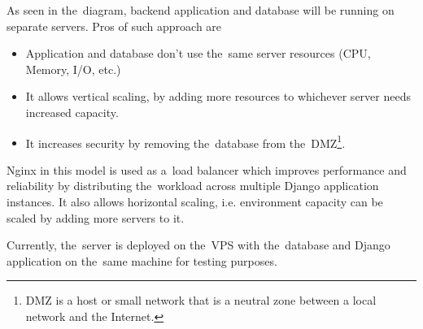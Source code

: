 As seen in the~diagram, backend application and database will be running on separate servers. Pros of such approach are

\begin{itemize}
    \item Application and database don't use the~same server resources (CPU, Memory, I/O, etc.)
    \item It allows vertical scaling, by adding more resources to whichever server needs increased capacity.
    \item It increases security by removing the~database from the~\ac{DMZ}\footnote{\ac{DMZ} is a host or small network
that is a neutral zone between a local network and the Internet.}.
\end{itemize}

Nginx in this model is used as a~load balancer which improves performance and reliability by distributing the~workload
across multiple Django application instances. It also allows horizontal scaling, i.e. environment capacity can be scaled
by adding more servers to it.

Currently, the~server is deployed on the~\ac{VPS} with the~database and Django application on the~same machine for
testing purposes.
